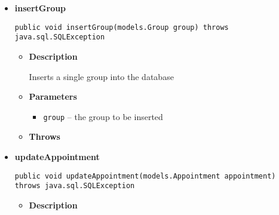 {{{{\begin{itemize}
{\begin{itemize}
{Inserts into the table Appointment, and, if applicable, into Reservation and Booking as well
}
\item{
{\bf  Parameters}
  \begin{itemize}
   \item{
\texttt{appointment} -- the Appointment to be inserted}
  \end{itemize}
}%
\item{{\bf  Throws}
}%
\end{itemize}
}%
\item{ 
\hypertarget{repository.DBRepository.insertGroup(models.Group)}{{\bf  insertGroup}\\}
\begin{lstlisting}[frame=none]
public void insertGroup(models.Group group) throws java.sql.SQLException\end{lstlisting} %
\begin{itemize}
\item{
{\bf  Description}

Inserts a single group into the database
}
\item{
{\bf  Parameters}
  \begin{itemize}
   \item{
\texttt{group} -- the group to be inserted}
  \end{itemize}
}%
\item{{\bf  Throws}
}%
\end{itemize}
}%
\item{ 
\hypertarget{repository.DBRepository.updateAppointment(models.Appointment)}{{\bf  updateAppointment}\\}
\begin{lstlisting}[frame=none]
public void updateAppointment(models.Appointment appointment) throws java.sql.SQLException\end{lstlisting} %
\begin{itemize}
\item{
{\bf  Description}

}
\end{itemize}}
\end{itemize}}}}}
